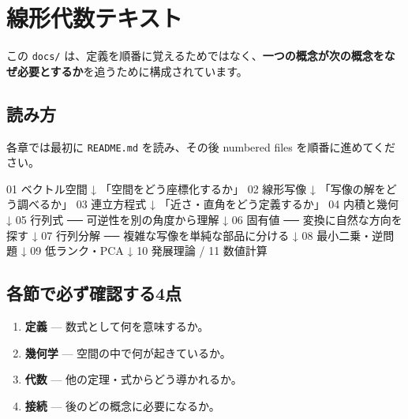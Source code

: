 \documentclass[
  11pt,
  a4paper,
]{ltjsarticle}
\author{}
\date{}
\newenvironment{Shaded}{}{}
\newcommand{\NormalTok}[1]{#1}
\providecommand{\tightlist}{%
  \setlength{\itemsep}{0pt}\setlength{\parskip}{0pt}}
\begin{document}
\hypertarget{ux7ddaux5f62ux4ee3ux6570ux30c6ux30adux30b9ux30c8}{%
\section{線形代数テキスト}\label{ux7ddaux5f62ux4ee3ux6570ux30c6ux30adux30b9ux30c8}}

この \texttt{docs/}
は、定義を順番に覚えるためではなく、\textbf{一つの概念が次の概念をなぜ必要とするか}を追うために構成されています。

\hypertarget{ux8aadux307fux65b9}{%
\subsection{読み方}\label{ux8aadux307fux65b9}}

各章では最初に \texttt{README.md} を読み、その後 numbered files
を順番に進めてください。

\begin{Shaded}
\begin{Highlighting}[]
\NormalTok{01 ベクトル空間}
\NormalTok{ ↓ 「空間をどう座標化するか」}
\NormalTok{02 線形写像}
\NormalTok{ ↓ 「写像の解をどう調べるか」}
\NormalTok{03 連立方程式}
\NormalTok{ ↓ 「近さ・直角をどう定義するか」}
\NormalTok{04 内積と幾何}
\NormalTok{ ↓}
\NormalTok{05 行列式 ── 可逆性を別の角度から理解}
\NormalTok{ ↓}
\NormalTok{06 固有値 ── 変換に自然な方向を探す}
\NormalTok{ ↓}
\NormalTok{07 行列分解 ── 複雑な写像を単純な部品に分ける}
\NormalTok{ ↓}
\NormalTok{08 最小二乗・逆問題}
\NormalTok{ ↓}
\NormalTok{09 低ランク・PCA}
\NormalTok{ ↓}
\NormalTok{10 発展理論 / 11 数値計算}
\end{Highlighting}
\end{Shaded}

\hypertarget{ux5404ux7bc0ux3067ux5fc5ux305aux78baux8a8dux3059ux308b4ux70b9}{%
\subsection{各節で必ず確認する4点}\label{ux5404ux7bc0ux3067ux5fc5ux305aux78baux8a8dux3059ux308b4ux70b9}}

\begin{enumerate}
\def\labelenumi{\arabic{enumi}.}
\tightlist
\item
  \textbf{定義} --- 数式として何を意味するか。
\item
  \textbf{幾何学} --- 空間の中で何が起きているか。
\item
  \textbf{代数} --- 他の定理・式からどう導かれるか。
\item
  \textbf{接続} --- 後のどの概念に必要になるか。
\end{enumerate}
\end{document}
